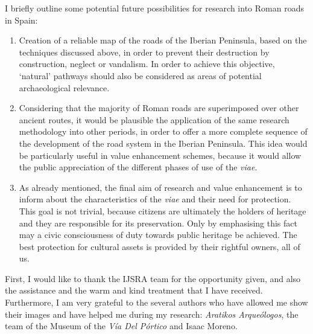 
I  briefly outline some potential future possibilities for research into Roman roads in Spain:

\begin{enumerate}
	\item Creation of a reliable map of the roads of the Iberian Peninsula, based on the techniques discussed above, in order to prevent their destruction by construction, neglect or vandalism. In order to achieve this objective, ‘natural’ pathways should also be considered as areas of potential archaeological relevance.
	\item Considering that the majority of Roman roads are superimposed over other ancient routes, it would be plausible the application of the same research methodology into other periods, in order to offer a more complete sequence of the development of the road system in the Iberian Peninsula. This idea would be particularly useful in value enhancement schemes, because it would allow the public appreciation of the different phases of use of the \textit{viae}.
	\item As already mentioned, the final aim of research and value enhancement is to inform about the characteristics of the \textit{viae} and their need for protection. This goal is not trivial, because citizens are ultimately the holders of heritage and they are responsible for its preservation. Only by emphasising this fact may a civic consciousness of duty towards public heritage be achieved. The best protection for cultural assets is provided by their rightful owners, all of us.
\end{enumerate}
\myseparator
First, I would like to thank the IJSRA team for the opportunity given, and also the assistance and the warm and kind treatment that I have received. Furthermore, I am very grateful to the several authors who have allowed me show their images and have helped me during my research: \textit{Aratikos Arqueólogos}, the team of the Museum of the \textit{Vía Del Pórtico} and Isaac Moreno.


